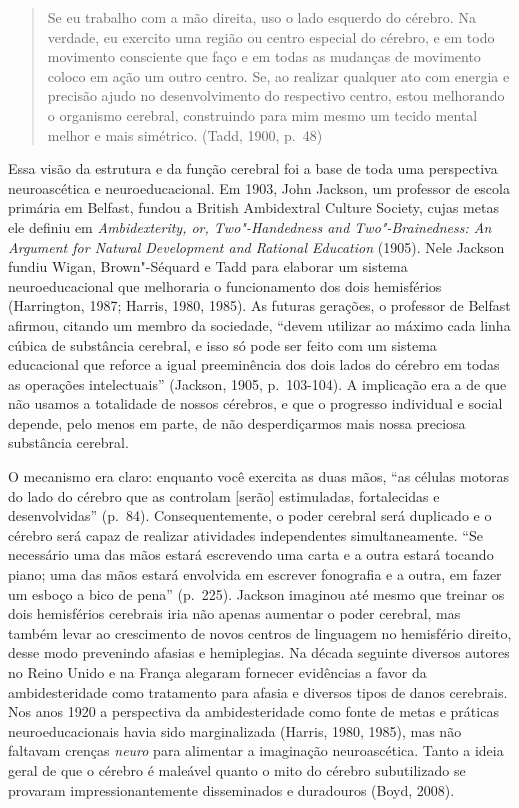 \begin{quote}
Se eu trabalho com a mão direita, uso o lado esquerdo do cérebro. Na
verdade, eu exercito uma região ou centro especial do cérebro, e em todo
movimento consciente que faço e em todas as mudanças de movimento coloco
em ação um outro centro. Se, ao realizar qualquer ato com energia e
precisão ajudo no desenvolvimento do respectivo centro, estou melhorando
o organismo cerebral, construindo para mim mesmo um tecido mental melhor
e mais simétrico. (Tadd, 1900, p.~48)
\end{quote}

Essa visão da estrutura e da função cerebral foi a base de toda uma
perspectiva neuroascética e neuroeducacional. Em 1903, John Jackson, um
professor de escola primária em Belfast, fundou a British Ambidextral
Culture Society, cujas metas ele definiu em \emph{Ambidexterity, or,
Two"-Handedness and Two"-Brainedness: An Argument for Natural Development
and Rational Education} (1905). Nele Jackson fundiu Wigan, Brown"-Séquard
e Tadd para elaborar um sistema neuroeducacional que melhoraria o
funcionamento dos dois hemisférios (Harrington, 1987; Harris, 1980,
1985). As futuras gerações, o professor de Belfast afirmou, citando um
membro da sociedade, ``devem utilizar ao máximo cada linha cúbica de
substância cerebral, e isso só pode ser feito com um sistema educacional
que reforce a igual preeminência dos dois lados do cérebro em todas as
operações intelectuais'' (Jackson, 1905, p.~103-104). A implicação era a
de que não usamos a totalidade de nossos cérebros, e que o progresso
individual e social depende, pelo menos em parte, de não desperdiçarmos
mais nossa preciosa substância cerebral.

O mecanismo era claro: enquanto você exercita as duas mãos, ``as células
motoras do lado do cérebro que as controlam {[}serão{]} estimuladas,
fortalecidas e desenvolvidas'' (p.~84). Consequentemente, o poder
cerebral será duplicado e o cérebro será capaz de realizar atividades
independentes simultaneamente. ``Se necessário uma das mãos estará
escrevendo uma carta e a outra estará tocando piano; uma das mãos estará
envolvida em escrever fonografia e a outra, em fazer um esboço a bico de
pena'' (p.~225). Jackson imaginou até mesmo que treinar os dois
hemisférios cerebrais iria não apenas aumentar o poder cerebral, mas
também levar ao crescimento de novos centros de linguagem no hemisfério
direito, desse modo prevenindo afasias e hemiplegias. Na década seguinte
diversos autores no Reino Unido e na França alegaram fornecer evidências
a favor da ambidesteridade como tratamento para afasia e diversos tipos
de danos cerebrais. Nos anos 1920 a perspectiva da ambidesteridade como
fonte de metas e práticas neuroeducacionais havia sido marginalizada
(Harris, 1980, 1985), mas não faltavam crenças \emph{neuro} para
alimentar a imaginação neuroascética. Tanto a ideia geral de que o
cérebro é maleável quanto o mito do cérebro subutilizado se provaram
impressionantemente disseminados e duradouros (Boyd, 2008).

